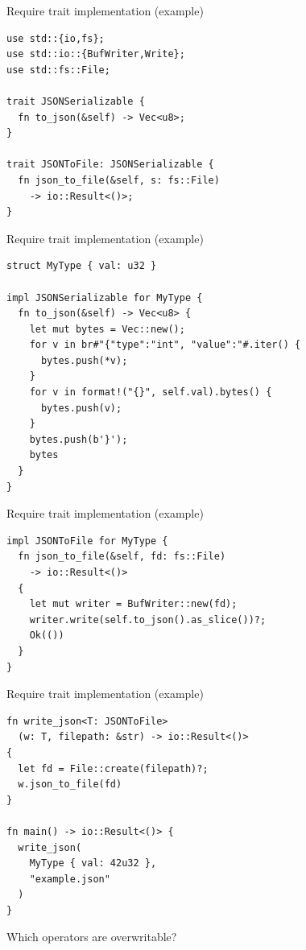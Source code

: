 \documentclass{beamer}
\begin{document}
\begin{frame}[fragile]{Require trait implementation (example)}
  \begin{verbatim}
use std::{io,fs};
use std::io::{BufWriter,Write};
use std::fs::File;

trait JSONSerializable {
  fn to_json(&self) -> Vec<u8>;
}

trait JSONToFile: JSONSerializable {
  fn json_to_file(&self, s: fs::File)
    -> io::Result<()>;
}    
\end{verbatim}
\end{frame}

\begin{frame}[fragile]{Require trait implementation (example)}
  \begin{verbatim}
struct MyType { val: u32 }

impl JSONSerializable for MyType {
  fn to_json(&self) -> Vec<u8> {
    let mut bytes = Vec::new();
    for v in br#"{"type":"int", "value":"#.iter() {
      bytes.push(*v);
    }
    for v in format!("{}", self.val).bytes() {
      bytes.push(v);
    }
    bytes.push(b'}');
    bytes
  }
}

\end{verbatim}
\end{frame}

\begin{frame}[fragile]{Require trait implementation (example)}
  \begin{verbatim}
impl JSONToFile for MyType {
  fn json_to_file(&self, fd: fs::File)
    -> io::Result<()>
  {
    let mut writer = BufWriter::new(fd);
    writer.write(self.to_json().as_slice())?;
    Ok(())
  }
}
\end{verbatim}
\end{frame}

\begin{frame}[fragile]{Require trait implementation (example)}
  \begin{verbatim}
fn write_json<T: JSONToFile>
  (w: T, filepath: &str) -> io::Result<()>
{
  let fd = File::create(filepath)?;
  w.json_to_file(fd)
}

fn main() -> io::Result<()> {
  write_json(
    MyType { val: 42u32 },
    "example.json"
  )
}
\end{verbatim}
\end{frame}

\begin{frame}[standout]
  Which operators are overwritable?
\end{frame}
\end{document}
